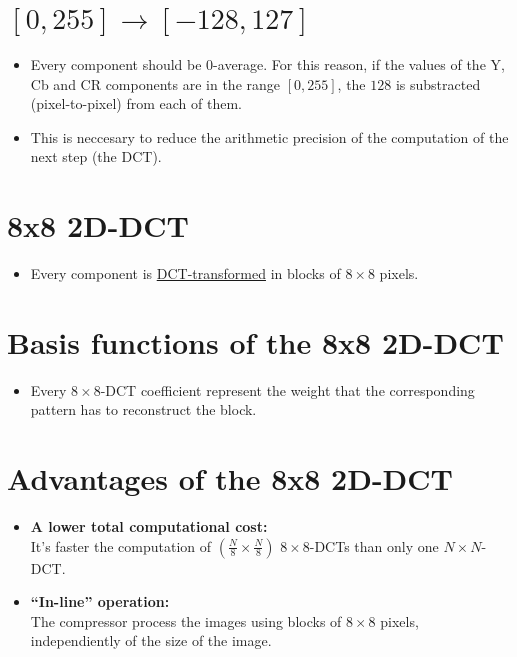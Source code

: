 \section{$[0,255]\rightarrow [-128,127]$}
\begin{itemize}
\item Every component should be 0-average. For this reason, if the
  values of the Y, Cb and CR components are in the range $[0,255]$,
  the $128$ is substracted (pixel-to-pixel) from each of them.
\item This is neccesary to reduce the arithmetic precision of the
  computation of the next step (the DCT).
\end{itemize}

\section{8x8 2D-DCT}
\begin{itemize}
\item Every component is
  \href{https://vicente-gonzalez-ruiz.github.io/image_transformations_for_coding/#x1-2800019}{DCT-transformed}
  in blocks of $8\times 8$ pixels.
\end{itemize}

\section{Basis functions of the 8x8 2D-DCT}
\begin{itemize}
\item Every $8\times 8$-DCT coefficient represent the weight that the
  corresponding pattern has to reconstruct the block.
\end{itemize}
\vspace{-3ex}
\begin{center}
\end{center}

\section{Advantages of the 8x8 2D-DCT}
\begin{itemize}
\item \textbf{A lower total computational cost:}\\ It's faster the
  computation of $(\frac{N}{8}\times \frac{N}{8})$ $8\times 8$-DCTs
  than only one $N\times N$-DCT.
\item \textbf{``In-line'' operation:}\\
  The compressor process the images using blocks of $8\times 8$
  pixels, independiently of the size of the image.
\end{itemize}


